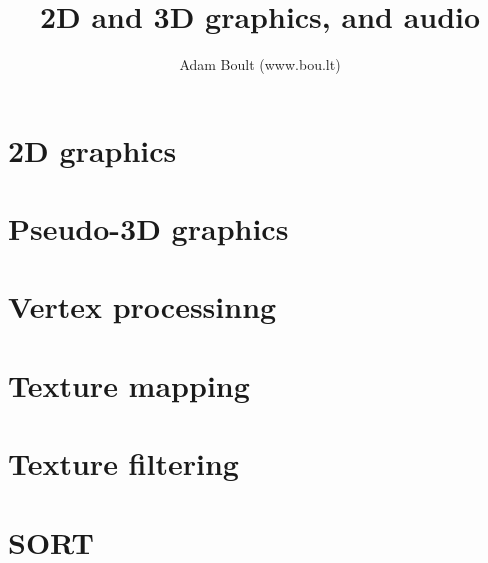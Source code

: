 \documentclass[oneside]{book}
\begin{document}
\author{Adam Boult (www.bou.lt)}
\title{2D and 3D graphics, and audio}
\maketitle

\setcounter{tocdepth}{0}
\tableofcontents



\part{2D graphics}





\part{Pseudo-3D graphics}




\part{Vertex processinng}



\part{Texture mapping}


\part{Texture filtering}


\part{SORT}

\end{document}
